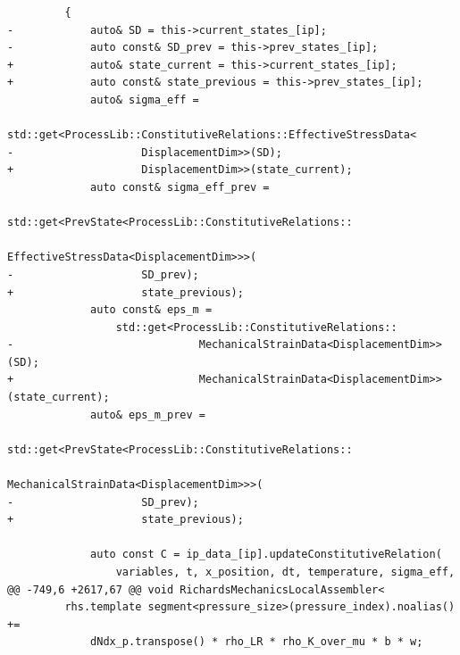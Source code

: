 \documentclass[10pt]{article}
\begin{document}
\begin{lstlisting}
         {
-            auto& SD = this->current_states_[ip];
-            auto const& SD_prev = this->prev_states_[ip];
+            auto& state_current = this->current_states_[ip];
+            auto const& state_previous = this->prev_states_[ip];
             auto& sigma_eff =
                 std::get<ProcessLib::ConstitutiveRelations::EffectiveStressData<
-                    DisplacementDim>>(SD);
+                    DisplacementDim>>(state_current);
             auto const& sigma_eff_prev =
                 std::get<PrevState<ProcessLib::ConstitutiveRelations::
                                        EffectiveStressData<DisplacementDim>>>(
-                    SD_prev);
+                    state_previous);
             auto const& eps_m =
                 std::get<ProcessLib::ConstitutiveRelations::
-                             MechanicalStrainData<DisplacementDim>>(SD);
+                             MechanicalStrainData<DisplacementDim>>(state_current);
             auto& eps_m_prev =
                 std::get<PrevState<ProcessLib::ConstitutiveRelations::
                                        MechanicalStrainData<DisplacementDim>>>(
-                    SD_prev);
+                    state_previous);
 
             auto const C = ip_data_[ip].updateConstitutiveRelation(
                 variables, t, x_position, dt, temperature, sigma_eff,
@@ -749,6 +2617,67 @@ void RichardsMechanicsLocalAssembler<
         rhs.template segment<pressure_size>(pressure_index).noalias() +=
             dNdx_p.transpose() * rho_LR * rho_K_over_mu * b * w;
 

\end{lstlisting}
\end{document}
